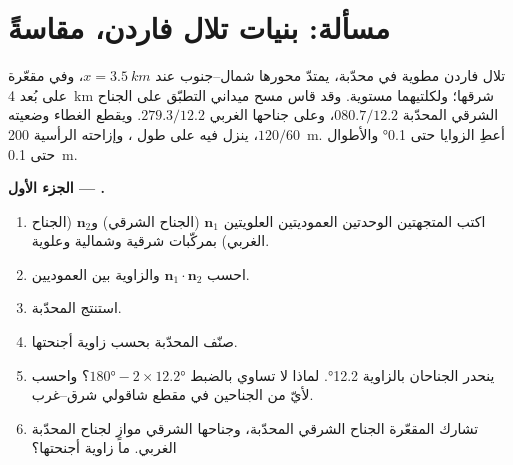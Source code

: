 \section{مسألة: بنيات تلال فاردن، مقاسةً}

\begin{problem}
\label{pb:b1:faults-folds-fabrics:1}
تلال فاردن مطوية في  محدّبة، يمتدّ محورها شمال--جنوب عند $x = \qty{3.5}{km}$، وفي  مقعّرة على بُعد \qty{4}{km} شرقها؛ ولكلتيهما  مستوية. وقد قاس مسح ميداني التطبّق على الجناح الشرقي  المحدّبة  $080.7/12.2$، وعلى جناحها الغربي  $279.3/12.2$. ويقطع الغطاء  وضعيته $120/60$، ينزل فيه  على طول ، وإزاحته الرأسية \qty{200}{m}. أعطِ الزوايا حتى \ang{0.1} والأطوال حتى \qty{0.1}{m}.

\medskip
\noindent\textbf{الجزء الأول --- .}
\begin{enumerate}
  \item اكتب المتجهتين الوحدتين العموديتين العلويتين $\mathbf n_1$ (الجناح الشرقي) و$\mathbf n_2$ (الجناح الغربي) بمركّبات شرقية وشمالية وعلوية.
  \item احسب $\mathbf n_1\cdot\mathbf n_2$ والزاوية بين العموديين.
  \item استنتج   المحدّبة.
  \item صنّف  المحدّبة بحسب زاوية أجنحتها.
  \item ينحدر الجناحان بالزاوية \ang{12.2}. لماذا لا تساوي  بالضبط $\ang{180} - 2\times\ang{12.2}$؟ واحسب  لأيّ من الجناحين في مقطع شاقولي شرق--غرب.
  \item تشارك  المقعّرة الجناح الشرقي  المحدّبة، وجناحها الشرقي موازٍ لجناح  المحدّبة الغربي. ما زاوية أجنحتها؟
\end{enumerate}


\end{problem}
